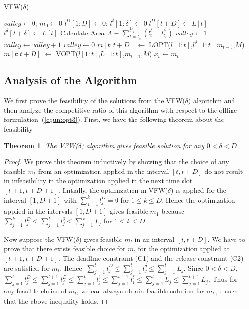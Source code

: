 \documentclass[10pt,conference,compsocconf,letterpaper]{IEEEtran}
\newtheorem{theorem}[lemma]{\bf Theorem}
\begin{document}
\begin{algorithm}
\caption{VFW($\delta$)}
\label{VFW}
{\small{
\begin{algorithmic}[1]
\STATE $valley \leftarrow 0$; $m_0 \leftarrow 0$
\STATE $l^D[1:D] \leftarrow 0$; $l^\delta[1:\delta] \leftarrow 0$
\STATE $l^D[t+D] \leftarrow L[t]$
\STATE $l^\delta[t+\delta] \leftarrow L[t]$
\STATE Calculate Area $A = \sum_{t=t_s}^{t'_s} (l^\delta_t-l^\delta_{t_s})$
\STATE $valley \leftarrow 1$
\ENDIF
{}
\STATE $valley \leftarrow valley +1$
\ELSE
\STATE $valley \leftarrow 0$
\ENDIF
{}
\STATE $m[t:t+D]$ $\leftarrow$ LOPT($l[1:t]$,$l^\delta[1:t]$,$m_{t-1}$,$M$)
\ELSE
\STATE $m[t:t+D]$ $\leftarrow$ VOPT($l[1:t]$,$L[1:t]$,$m_{t-1}$,$M$)
\ENDIF
\STATE $x_t \leftarrow m_t$
\ENDFOR
\end{algorithmic}
}}
\end{algorithm}




\subsection{Analysis of the Algorithm}
We first prove the feasibility of the solutions from the VFW($\delta$) algorithm and then analyze the competitive ratio of this algorithm with respect to the offline formulation~(\ref{equn:opt3}). First, we have the following theorem about the feasibility.


\begin{theorem}
\label{theorem:online3}
The VFW($\delta$) algorithm gives feasible solution for any $0<\delta<D$.
\end{theorem}

\begin{proof}
We prove this theorem inductively by showing that the choice of any feasible $m_t$ from an optimization applied in the interval $[t,t+D]$ do not result in infeasibility in the optimization applied in the next time slot $[t+1,t+D+1]$. Initially, the optimization in VFW($\delta$) is applied for the interval $[1,D+1]$ with $\sum_{j=1}^{k} l^D_j = 0$ for $1\le k \le D$. Hence the optimization applied in the intervals $[1,D+1]$ gives feasible  $m_1$ because $\sum_{j=1}^{k} l^D_j \le \sum_{j=1}^{k} l^\delta_j \le \sum_{j=1}^{k} L_j$ for $1\le k \le D$.

Now suppose the VFW($\delta$) gives feasible $m_t$ in an interval $[t,t+D]$. We have to prove that there exists feasible choice for $m_t$ for the optimization applied at $[t+1,t+D+1]$. The deadline constraint (C1) and the release constraint (C2) are satisfied for $m_t$. Hence, $\sum_{j=1}^{t} l^D_j \le \sum_{j=1}^{t} l^\delta_j \le \sum_{j=1}^{t} L_j$. Since $0<\delta<D$, $\sum_{j=1}^{t} l^D_j \le \sum_{j=1}^{t+1} l^D_j \le \sum_{j=1}^{t} l^\delta_j \le \sum_{j=1}^{t+1} l^\delta_j \le \sum_{j=1}^{t} L_j\le \sum_{j=1}^{t+1} L_j$. Thus for any feasible choice of $m_t$, we can always obtain feasible solution for $m_{t+1}$ such that the above inequality holds.
\end{proof}
\end{document}
